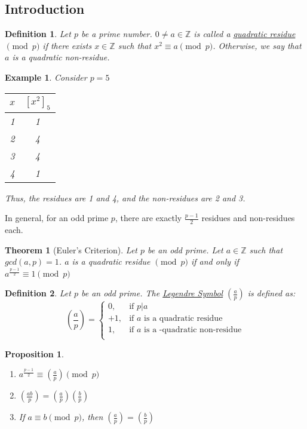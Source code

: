 \documentclass{article}
\newcommand{\Z}{\mathbb{Z}}
\newtheorem{theorem}{Theorem}[subsection]
\newtheorem{example}{Example}[subsection]
\newtheorem{proposition}{Proposition}[subsection]
\newtheorem{definition}{Definition}[subsection]
\begin{document}
\subsection{Introduction}
\begin{definition}
Let $p$ be a prime number. $0\neq a\in \Z$ is called a \underline{quadratic residue} $\pmod{p}$ if there exists $x\in\Z$ such that $x^2\equiv a\pmod{p}$. Otherwise, we say that $a$ is a quadratic non-residue.
\end{definition}
\begin{example}
Consider $p=5$
\begin{center}
\begin{tabular}{|c|c|}
\hline
    $x$ & $[x^2]_5$ \\\hline\hline
    1 & 1\\\hline
    2 & 4\\ \hline
    3 & 4\\ \hline
    4 & 1\\ \hline
\end{tabular}
\end{center}
Thus, the residues are 1 and 4, and the non-residues are 2 and 3.
\end{example}
In general, for an odd prime $p$, there are exactly $\frac{p-1}{2}$ residues and non-residues each.
\begin{theorem}[Euler's Criterion]
Let $p$ be an odd prime. Let $a\in \Z$ such that $gcd(a,p)=1$. $a$ is a quadratic residue $\pmod{p}$ if and only if $a^{\frac{p-1}{2}}\equiv 1\pmod{p}$
\end{theorem}
\begin{definition}
Let $p$ be an odd prime. The \underline{Legendre Symbol} $\displaystyle\left(\frac{a}{p}\right)$ is defined as:
\begin{equation*}
    \left(\frac{a}{p}\right)=
    \begin{cases}
0, &\text{if }p|a\\
+1, &\text{if $a$ is a quadratic residue}\\
1, &\text{if $a$ is a -quadratic non-residue}\\
    \end{cases}
\end{equation*}
\end{definition}
\begin{proposition}
\begin{enumerate}[1)]
    \item $a^{\frac{p-1}{2}}\equiv \left(\frac{a}{p}\right)\pmod{p}$
    \item $\left(\frac{ab}{p}\right)=\left(\frac{a}{p}\right)\left(\frac{b}{p}\right)$
    \item If $a\equiv b\pmod{p}$, then $\left(\frac{a}{p}\right)=\left(\frac{b}{p}\right)$
\end{enumerate}
\end{proposition}
\end{document}
